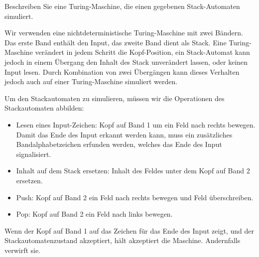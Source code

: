 Beschreiben Sie eine Turing-Maschine, die einen gegebenen Stack-Automaten simuliert.


\begin{loesung}
Wir verwenden eine nichtdeterministische Turing-Maschine mit zwei Bändern.
Das erste Band
enthält den Input, das zweite Band dient als Stack. Eine Turing-Maschine
verändert in jedem Schritt die Kopf-Position, ein Stack-Automat kann
jedoch in einem Übergang den Inhalt des Stack unverändert lassen,
oder keinen Input lesen. Durch Kombination von zwei Übergängen
kann dieses Verhalten jedoch auch auf einer Turing-Maschine simuliert
werden.

Um den Stackautomaten zu simulieren, müssen wir die Operationen des
Stackautomaten abbilden:
\begin{itemize}
\item Lesen eines Input-Zeichen: Kopf auf Band 1 um ein Feld nach
rechts bewegen. Damit das Ende des Input erkannt werden kann, muss ein
zusätzliches Bandalphabetzeichen erfunden werden, welches das Ende
des Input signalisiert.
\item Inhalt auf dem Stack ersetzen: Inhalt des Feldes unter dem Kopf
auf Band 2 ersetzen.
\item Push: Kopf auf Band 2 ein Feld nach rechts bewegen und Feld überschreiben.
\item Pop: Kopf auf Band 2 ein Feld nach links bewegen.
\end{itemize}
Wenn der Kopf auf Band 1 auf das Zeichen für das Ende des Input zeigt,
und der Stackautomatenzustand akzeptiert, hält akzeptiert die Maschine.
Andernfalls verwirft sie.
\end{loesung}
